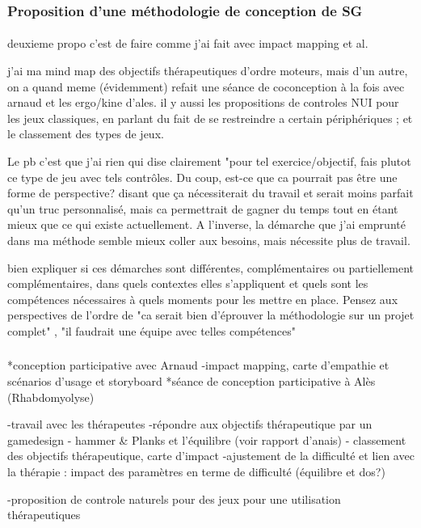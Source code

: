 	
	\subsubsection{Proposition d'une méthodologie de conception de SG}
	\paragraph{}
	deuxieme propo c'est de faire comme j'ai fait avec impact mapping et al.
	
	  j'ai ma mind map des objectifs thérapeutiques d'ordre moteurs, mais d'un autre, on a quand meme (évidemment) refait une séance de coconception à la fois avec arnaud et les ergo/kine d'ales. il y  aussi les propositions de controles NUI pour les jeux classiques, en parlant du fait de se restreindre a certain périphériques ; et le classement des types de jeux.
	 
 Le pb c'est que j'ai rien qui dise clairement "pour tel exercice/objectif, fais plutot ce type de jeu avec tels contrôles. Du coup, est-ce que ca pourrait pas être une forme de perspective? disant que ça nécessiterait du travail et serait moins parfait qu'un truc personnalisé, mais ca permettrait de gagner du temps tout en étant mieux que ce qui existe actuellement. A l'inverse, la démarche que j'ai emprunté dans ma méthode semble mieux coller aux besoins, mais nécessite plus de travail.
 
 bien expliquer si ces démarches sont différentes, complémentaires ou partiellement complémentaires, dans quels contextes elles s'appliquent et quels sont les compétences nécessaires à quels moments pour les mettre en place.
 Pensez aux perspectives de l'ordre de "ca serait bien d'éprouver la méthodologie sur un projet complet" , "il faudrait une équipe avec telles compétences"
		\subsubsection{}

	*conception participative avec Arnaud 
		-impact mapping, carte d'empathie et scénarios d'usage et storyboard
	*séance de conception participative à Alès (Rhabdomyolyse)
	
	-travail avec les thérapeutes
	-répondre aux objectifs thérapeutique par un gamedesign
		- hammer \& Planks et l'équilibre (voir rapport d'anais)
		- classement des objectifs thérapeutique, carte d'impact
	-ajustement de la difficulté et lien avec la thérapie : impact des paramètres en terme de difficulté (équilibre et dos?)
	
	-proposition de controle naturels pour des jeux pour une utilisation thérapeutiques